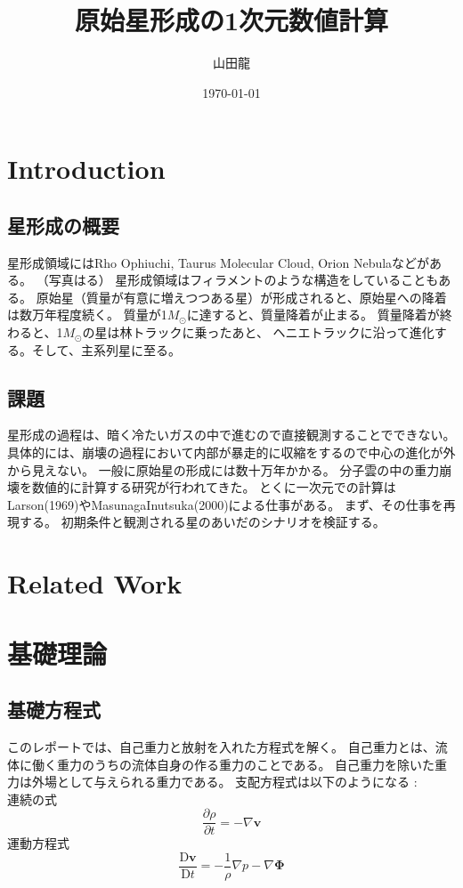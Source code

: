 \documentclass{jsarticle}
\date{\today}
\author{山田龍}
\title{原始星形成の1次元数値計算}
\newcommand{\bv}{\mathbf{v}}
\newcommand{\pder}[2][]{\frac{\partial#1}{\partial#2}}
\newcommand{\Dder}[2][]{\frac{\mathrm{D}#1}{\mathrm{D}#2}}
\begin{document}
\maketitle
\section{Introduction}
\subsection{星形成の概要}
星形成領域にはRho Ophiuchi, Taurus Molecular Cloud, Orion Nebulaなどがある。
（写真はる）
星形成領域はフィラメントのような構造をしていることもある。
原始星（質量が有意に増えつつある星）が形成されると、原始星への降着は数万年程度続く。
質量が1$M_\odot$に達すると、質量降着が止まる。
質量降着が終わると、1$M_\odot$の星は林トラックに乗ったあと、
ヘニエトラックに沿って進化する。そして、主系列星に至る。

\subsection{課題}
星形成の過程は、暗く冷たいガスの中で進むので直接観測することでできない。
具体的には、崩壊の過程において内部が暴走的に収縮をするので中心の進化が外から見えない。
一般に原始星の形成には数十万年かかる。
分子雲の中の重力崩壊を数値的に計算する研究が行われてきた。
とくに一次元での計算はLarson(1969)やMasunagaInutsuka(2000)による仕事がある。
まず、その仕事を再現する。
初期条件と観測される星のあいだのシナリオを検証する。

\section{Related Work}
\section{基礎理論}
\subsection{基礎方程式}
このレポートでは、自己重力と放射を入れた方程式を解く。
自己重力とは、流体に働く重力のうちの流体自身の作る重力のことである。
自己重力を除いた重力は外場として与えられる重力である。
支配方程式は以下のようになる :\\
連続の式
\begin{equation}
    \pder[\rho]{t} = - \nabla \bv
\end{equation}
運動方程式
\begin{equation}
    \Dder[\bv]{t} = - \frac{1}{\rho}\nabla{p} - \nabla\mathbf{\Phi}\label{eq:euler}
\end{equation}
\end{document}
